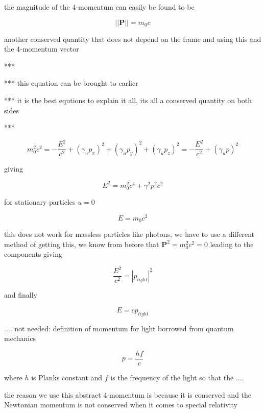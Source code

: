 the magnitude of the 4-momentum can easily be found to be

\begin{equation}
	||\mathbf{P}|| = m_0 c
\end{equation}

another conserved quantity that does not depend on the frame and using this and the 4-momentum vector

***

*** this equation can be brought to earlier

*** it is the best equtions to explain it all, its all a conserved quantity on both sides

***

\begin{equation}
	m^2_0 c^2 = - \frac{E^2}{c^2} + (\gamma_u p_x)^2 + (\gamma_u p_y)^2 + (\gamma_u p_z)^2 = - \frac{E^2}{c^2} + (\gamma_u p)^2
\end{equation}

giving

\begin{equation}
	E^2 = m_0^2c^4 +\gamma^2p^2c^2
\end{equation}

for stationary particles $u=0$

\begin{equation}
	E = m_0c^2
\end{equation}

this does not work for massless particles like photons, we have to use a different method of getting this, we know from before that $ \mathbf{P}^2 = m_0^2 c^2 = 0$ leading to the components giving

\begin{equation}
	\frac{E^2}{c^2} = |p_{light}|^2
\end{equation}

and finally

\begin{equation}
	E = c p_{light}
\end{equation}

....
not needed:
definition of momentum for light borrowed from quantum mechanics

\begin{equation}
	p = \frac{hf}{c}
\end{equation}

where $h$ is Planks constant and $f$ is the frequency of the light
so that the
....

the reason we use this abstract 4-momentum is because it is conserved and the Newtonian momentum is not conserved when it comes to special relativity

